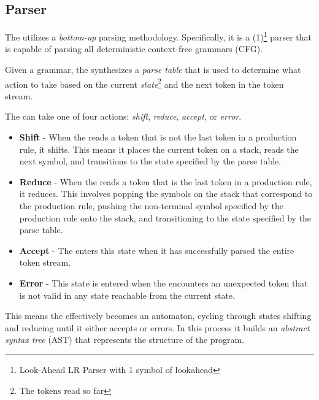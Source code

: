 \subsection{Parser}

The \lang{} \parser{} utilizes a \textit{bottom-up} parsing methodology.
Specifically, it is a \parserType{}(1)\footnote{Look-Ahead LR Parser with 1 symbol of
lookahead} parser that is capable of parsing all deterministic context-free
grammars (CFG).

Given a grammar, the \parser{} synthesizes a \textit{parse table} that is used to
determine what action to take based on the current \textit{state}\footnote{The tokens
read so far} and the next token in the token stream. 

The \parser{} can take one of four actions: \textit{shift}, \textit{reduce},
\textit{accept}, or \textit{error}. 

\begin{itemize} 
  
  \item \textbf{Shift} - When the \parser{} reads a token that is not the last token
    in a production rule, it shifts. This means it places the current token on a
    stack, reads the next symbol, and transitions to the state specified by the parse
    table.

  \item \textbf{Reduce} - When the \parser{} reads a token that is the last token in
    a production rule, it reduces. This involves popping the symbols on the stack
    that correspond to the production rule, pushing the non-terminal symbol specified
    by the production rule onto the stack, and transitioning to the state specified
    by the parse table.

  \item \textbf{Accept} - The \parser{} enters this state when it has successfully
    parsed the entire token stream.

  \item \textbf{Error} - This state is entered when the \parser{} encounters an
    unexpected token that is not valid in any state reachable from the current state.

\end{itemize}

This means the \parser{} effectively becomes an automaton, cycling through states
shifting and reducing until it either accepts or errors. In this process it builds an
\textit{abstract syntax tree} (AST) that represents the structure of the program.


